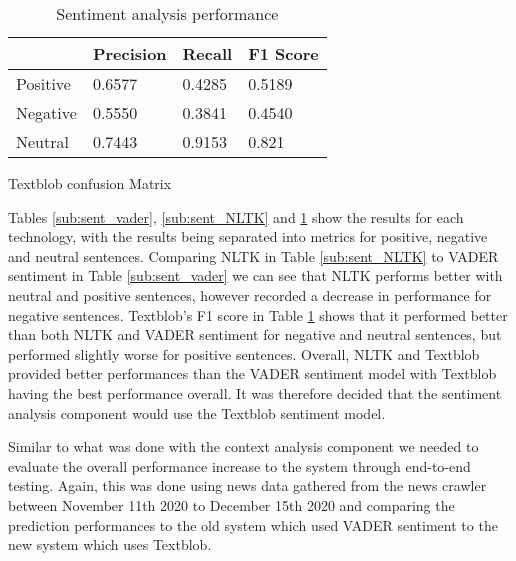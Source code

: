 \begin{table}[h]
            \begin{subtable}{\textwidth}
                \centering
                \begin{tabular}{|l|l|l|l|} 
                \hline
                         & Precision                                   & Recall                                                                         & F1 Score                                     \\ 
                \hline
                Positive & {0.6577} & {0.4285}                                    & {0.5189}   \\ 
                \hline
                Negative & {0.5550} & {}{0.3841} & {0.4540}  \\ 
                \hline
                Neutral  & {0.7443}  & {0.9153}                                    & {0.821}     \\
                \hline
                \end{tabular}
                \smallskip
                \caption{Textblob confusion Matrix} \label{sub:sent_Textblob}
            \end{subtable}
            
        \caption{Sentiment analysis performance}
        \end{table}
        
        Tables \ref{sub:sent_vader}, \ref{sub:sent_NLTK} and \ref{sub:sent_Textblob} show the results for each technology, with the results being separated into metrics for positive, negative and neutral sentences. Comparing NLTK in Table \ref{sub:sent_NLTK} to VADER sentiment in Table \ref{sub:sent_vader} we can see that NLTK performs better with neutral and positive sentences, however recorded a decrease in performance for negative sentences. Textblob's F1 score in Table \ref{sub:sent_Textblob} shows that it performed better than both NLTK and VADER sentiment for negative and neutral sentences, but performed slightly worse for positive sentences. Overall, NLTK and Textblob provided better performances than the VADER sentiment model with Textblob having the best performance overall. It was therefore decided that the sentiment analysis component would use the Textblob sentiment model.
        
        Similar to what was done with the context analysis component we needed to evaluate the overall performance increase to the system through end-to-end testing. Again, this was done using news data gathered from the news crawler between November 11th 2020 to December 15th 2020 and comparing the prediction performances to the old system which used VADER sentiment to the new system which uses Textblob.
        
